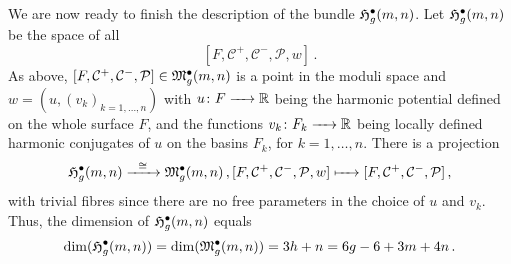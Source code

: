 We are now ready to finish the description of the bundle $\mathfrak{H}^{\bullet}_g(m, n)$.
Let $\mathfrak{H}^{\bullet}_g(m, n)$ be the space of all 
\[
   [F, \mathcal C^+, \mathcal C^-, \mathcal P, w]\,.
\] 
As above, $[F, \mathcal C^+, \mathcal C^-, \mathcal P] \in \mathfrak{M}^\bullet_g(m, n)$ is a point in the moduli space
and $w = (u, (v_k)_{k = 1, \dotsc, n})$ with
$u \colon F \xrightarrow{\hspace{6pt}{}\hspace{6pt}} \mathbb R$ being the harmonic potential defined on the whole surface $F$,
and the functions $v_k \colon F_k \xrightarrow{\hspace{6pt}{}\hspace{6pt}} \mathbb R$ being locally defined harmonic conjugates of $u$ on the basins $F_k$, for $k = 1, \dotsc, n$.
There is a projection
\[
  \mathfrak{H}^{\bullet}_g(m, n) \xrightarrow{\hspace{6pt}{\cong}\hspace{6pt}} \mathfrak{M}^\bullet_g(m, n)\,, [F, \mathcal C^+, \mathcal C^-, \mathcal P, w] \xmapsto{\hspace{6pt}{}\hspace{6pt}} [F, \mathcal C^+, \mathcal C^-, \mathcal P]\,,
\]
 with trivial fibres since there are no free parameters in the choice of $u$ and $v_k$.
Thus, the dimension of $\mathfrak{H}^{\bullet}_g(m, n)$ equals
\[
 \dim(\mathfrak{H}^{\bullet}_g(m, n)) = \dim(\mathfrak{M}^\bullet_g(m, n)) = 3h + n = 6g - 6 + 3 m + 4 n\,.
\]
